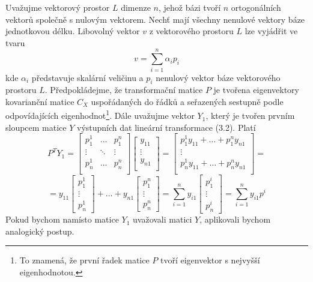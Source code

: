 \documentclass[a4paper]{book}
\begin{document}
Uvažujme vektorový prostor $L$ dimenze $n$, jehož bázi tvoří $n$ ortogonálních vektorů společně s nulovým vektorem. Nechť mají všechny nenulové vektory báze jednotkovou délku. Libovolný vektor $v$ z vektorového prostoru $L$ lze vyjádřit ve tvaru
\begin{equation}
v = \sum_{i=1}^n \alpha_i p_i 
\end{equation}
kde $\alpha_i$ představuje skalární veličinu a $p_i$ nenulový vektor báze vektorového prostoru $L$. Předpokládejme, že transformační matice $P$ je tvořena eigenvektory kovarianční matice $C_X$ uspořádaných do řádků a seřazených sestupně podle odpovídajících eigenhodnot\footnote{To znamená, že první řadek matice $P$ tvoří eigenvektor s nejvyšší eigenhodnotou.}. Dále uvažujme vektor $Y_1$, který je tvořen prvním sloupcem matice $Y$ výstupních dat lineární transformace (3.2). Platí
\begin{equation*}
P^TY_1 =
\begin{bmatrix}
p^1_1 & \dots & p^n_1 \\
\vdots & \ddots & \vdots \\
p^1_n & \dots & p^n_n \\
\end{bmatrix}
\begin{bmatrix}
y_{11} \\
\vdots \\
y_{n1} \\
\end{bmatrix}
=
\begin{bmatrix}
p^1_1 y_{11} + \dots + p^n_1 y_{n1} \\
\vdots \\
p^1_n y_{11} + \dots + p^n_n y_{n1} \\
\end{bmatrix}
=
\end{equation*}
\begin{equation}
=
y_{11} \begin{bmatrix} p^1_1 \\ \vdots \\ p^1_n \end{bmatrix}
+
\dots
+
y_{n1} \begin{bmatrix} p^n_1 \\ \vdots \\ p^n_n \end{bmatrix}
=
\sum_{i = 1}^n y_{i1} \begin{bmatrix} p^i_1 \\ \vdots \\ p^i_n \end{bmatrix} = \sum_{i = 1}^n y_{i1} p^i
\end{equation}
Pokud bychom namísto matice $Y_1$ uvažovali matici $Y$, aplikovali bychom analogický postup.
\end{document}

